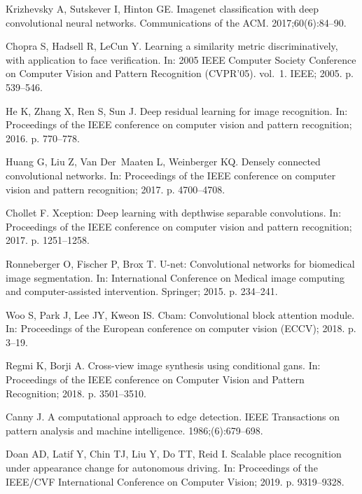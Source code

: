 \documentclass[10pt,letterpaper]{article}
\begin{document}
\begin{thebibliography}{10}
  Krizhevsky A, Sutskever I, Hinton GE.
  \newblock Imagenet classification with deep convolutional neural networks.
  \newblock Communications of the ACM. 2017;60(6):84--90.
  
  Chopra S, Hadsell R, LeCun Y.
  \newblock Learning a similarity metric discriminatively, with application to
    face verification.
  \newblock In: 2005 IEEE Computer Society Conference on Computer Vision and
    Pattern Recognition (CVPR'05). vol.~1. IEEE; 2005. p. 539--546.
  
  He K, Zhang X, Ren S, Sun J.
  \newblock Deep residual learning for image recognition.
  \newblock In: Proceedings of the IEEE conference on computer vision and pattern
    recognition; 2016. p. 770--778.
  
  Huang G, Liu Z, Van Der~Maaten L, Weinberger KQ.
  \newblock Densely connected convolutional networks.
  \newblock In: Proceedings of the IEEE conference on computer vision and pattern
    recognition; 2017. p. 4700--4708.
  
  Chollet F.
  \newblock Xception: Deep learning with depthwise separable convolutions.
  \newblock In: Proceedings of the IEEE conference on computer vision and pattern
    recognition; 2017. p. 1251--1258.
  
  Ronneberger O, Fischer P, Brox T.
  \newblock U-net: Convolutional networks for biomedical image segmentation.
  \newblock In: International Conference on Medical image computing and
    computer-assisted intervention. Springer; 2015. p. 234--241.
  
  Woo S, Park J, Lee JY, Kweon IS.
  \newblock Cbam: Convolutional block attention module.
  \newblock In: Proceedings of the European conference on computer vision (ECCV);
    2018. p. 3--19.
  
  Regmi K, Borji A.
  \newblock Cross-view image synthesis using conditional gans.
  \newblock In: Proceedings of the IEEE conference on Computer Vision and Pattern
    Recognition; 2018. p. 3501--3510.
  
  Canny J.
  \newblock A computational approach to edge detection.
  \newblock IEEE Transactions on pattern analysis and machine intelligence.
    1986;(6):679--698.
  
  Doan AD, Latif Y, Chin TJ, Liu Y, Do TT, Reid I.
  \newblock Scalable place recognition under appearance change for autonomous
    driving.
  \newblock In: Proceedings of the IEEE/CVF International Conference on Computer
    Vision; 2019. p. 9319--9328.
  

\end{thebibliography}
\end{document}
